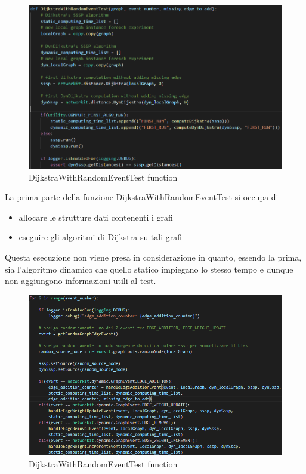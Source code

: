 \documentclass[a4paper]{article}
\begin{document}
\newpage
\begin{figure}[!h]
\includegraphics[scale=0.47]{img/01_DijkstraWithRandomEventTest}
\centering
\caption{DijkstraWithRandomEventTest function}
\end{figure}
La prima parte della funzione DijkstraWithRandomEventTest si occupa di 
\begin{itemize}
\item allocare le strutture dati contenenti i grafi
\item eseguire gli algoritmi di Dijkstra su tali grafi
\end{itemize}
Questa esecuzione non viene presa in considerazione in quanto, essendo la prima, sia l'algoritmo dinamico che quello statico impiegano lo stesso tempo e dunque non aggiungono informazioni utili al test.
\newpage
\begin{figure}[!h]
\includegraphics[scale=0.56]{img/02_DijkstraWithRandomEventTest}
\centering
\caption{DijkstraWithRandomEventTest function}
\end{figure}
\end{document}
